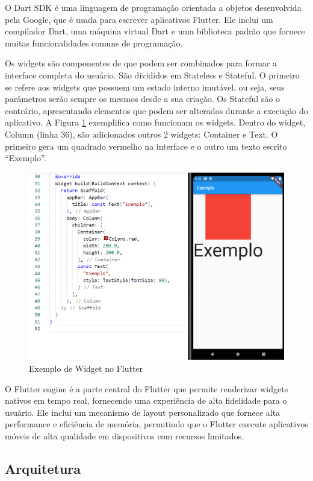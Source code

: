 \documentclass[12pt]{article}
\begin{document}
O Dart SDK é uma linguagem de programação orientada a objetos desenvolvida pela Google, que é usada para escrever aplicativos Flutter. Ele inclui um compilador Dart, uma máquina virtual Dart e uma biblioteca padrão que fornece muitas funcionalidades comuns de programação. 

Os widgets são componentes de que podem ser combinados para formar a interface completa do usuário. São divididos em Stateless e Stateful. O primeiro se refere aos widgets que possuem um estado interno imutável, ou seja, seus parâmetros serão sempre os mesmos desde a sua criação. Os Stateful são o contrário, apresentando elementos que podem ser alterados durante a execução do aplicativo. A Figura \ref{fig:widget} exemplifica como funcionam os widgets. Dentro do widget, Column (linha 36), são adicionados outros 2 widgets: Container e Text. O primeiro gera um quadrado vermelho na interface e o outro um texto escrito “Exemplo”.

\begin{figure}[ht!]
\centering
\includegraphics[width=.8\textwidth]{imagens/exemploFlutter.png}
\caption{Exemplo de Widget no Flutter}
\label{fig:widget}
\end{figure}

O Flutter engine é a parte central do Flutter que permite renderizar widgets nativos em tempo real, fornecendo uma experiência de alta fidelidade para o usuário. Ele inclui um mecanismo de layout personalizado que fornece alta performance e eficiência de memória, permitindo que o Flutter execute aplicativos móveis de alta qualidade em dispositivos com recursos limitados.


\subsection{Arquitetura} \label{sec:arq}
\end{document}
